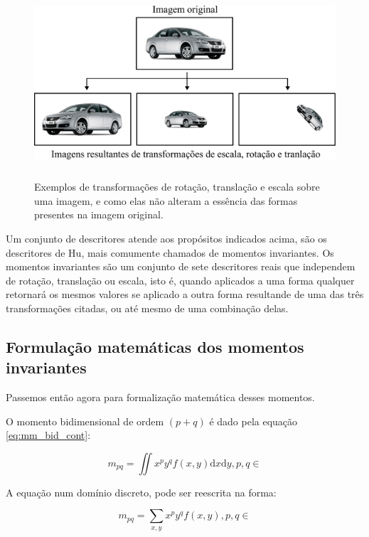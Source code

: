 \begin{figure}[H]
  \begin{center}
    \includegraphics[height=7cm]{imagens/carros_transformados.pdf}
  \end{center}
  \caption{ Exemplos de transformações de rotação, translação e escala sobre
    uma imagem, e como elas não alteram a essência das formas presentes na
    imagem original. }
  \label{fig:carros_transformados}
\end{figure}

Um conjunto de descritores atende aos propósitos indicados acima, são os
descritores de Hu, mais comumente chamados de momentos invariantes. Os momentos
invariantes são um conjunto de sete descritores reais que independem de rotação,
translação ou escala, isto é, quando aplicados a uma forma qualquer retornará
os mesmos valores se aplicado a outra forma resultande de uma das três
transformações citadas, ou até mesmo de uma combinação delas.

\subsection{Formulação matemáticas dos momentos invariantes}\label{sec:momentos_mat}

Passemos então agora para formalização matemática desses momentos.

O momento bidimensional de ordem $ (p+q) $ é dado pela
equação \ref{eq:mm_bid_cont}:

\begin{equation}\label{eq:mm_bid_cont}
m_{pq} = \iint x^p y^q f(x, y) \mathrm{d}x \mathrm{d}y, p, q \in
\end{equation}

A equação num domínio discreto, pode ser reescrita na forma:

\begin{equation}\label{eq:mm_bid_disc}
m_{pq} = \sum_{x, y} x^p y^q f(x, y), p, q \in
\end{equation}

